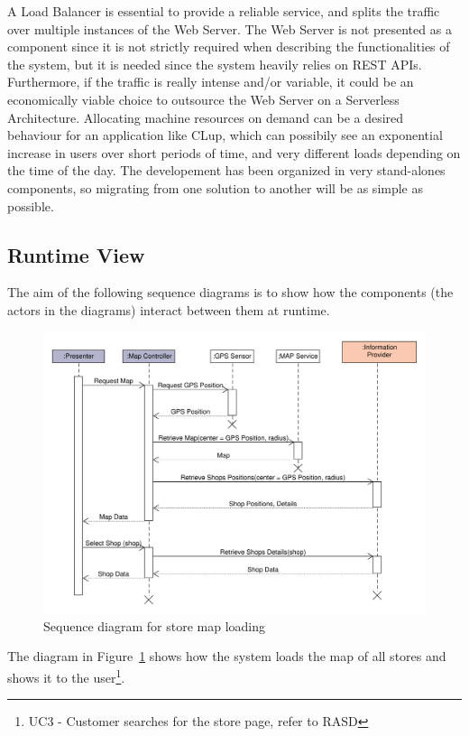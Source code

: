 A Load Balancer is essential to provide a reliable service, and splits the traffic over multiple instances of the Web Server. The Web Server is not presented as a component since it is not strictly required when describing the functionalities of the system, but it is needed since the system heavily relies on REST APIs. Furthermore, if the traffic is really intense and/or variable, it could be an economically viable choice to outsource the Web Server on a Serverless Architecture. Allocating machine resources on demand can be a desired behaviour for an application like CLup, which can possibily see an exponential increase in users over short periods of time, and very different loads depending on the time of the day. The developement has been organized in very stand-alones components, so migrating from one solution to another will be as simple as possible.



\clearpage
\subsection{Runtime View}
The aim of the following sequence diagrams is to show how the components (the actors in the diagrams) interact between them at runtime.
\begin{figure}[H]
    \includegraphics[width=\textwidth]{Images/UML_user_map_sequence.pdf}
    \caption{\label{fig:UML_user_map_sequence}Sequence diagram for store map loading}
\end{figure}
The diagram in Figure~\ref{fig:UML_user_map_sequence} shows how the system loads the map of all stores and shows it to the user\footnote{UC3 - Customer searches for the store page, refer to RASD}.

